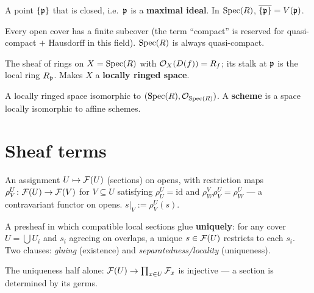 \begin{defbox}
A point $\{\mathfrak{p}\}$ that is closed, i.e.\ $\mathfrak{p}$ is a \textbf{maximal ideal}. In $\operatorname{Spec}(R)$,
$\overline{\{\mathfrak{p}\}}=V(\mathfrak{p})$.\hfill{}
\end{defbox}

\begin{defbox}
Every open cover has a finite subcover (the term ``compact'' is reserved for quasi-compact $+$
Hausdorff in this field). $\operatorname{Spec}(R)$ is always quasi-compact.\hfill{}
\end{defbox}

\begin{defbox}
The sheaf of rings on $X=\operatorname{Spec}(R)$ with $\mathcal{O}_X(D(f))=R_f$; its stalk at $\mathfrak{p}$ is the local ring
$R_{\mathfrak{p}}$. Makes $X$ a \textbf{locally ringed space}.\hfill{}
\end{defbox}

\begin{defbox}
A locally ringed space isomorphic to $(\operatorname{Spec}(R),\mathcal{O}_{\operatorname{Spec}(R)})$. A \textbf{scheme} is a space
locally isomorphic to affine schemes.\hfill{}
\end{defbox}

\section{Sheaf terms}

\begin{defbox}[Presheaf]
An assignment $U\mapsto\mathcal{F}(U)$ (sections) on opens, with restriction maps
$\rho^U_V\colon\mathcal{F}(U)\to\mathcal{F}(V)$ for $V\subseteq U$ satisfying $\rho^U_U=\mathrm{id}$ and
$\rho^V_W\rho^U_V=\rho^U_W$ --- a contravariant functor on opens. $s|_V:=\rho^U_V(s)$.\hfill{}
\end{defbox}

\begin{defbox}[Sheaf]
A presheaf in which compatible local sections glue \textbf{uniquely}: for any cover
$U=\bigcup U_i$ and $s_i$ agreeing on overlaps, a unique $s\in\mathcal{F}(U)$ restricts to each $s_i$.
Two clauses: \emph{gluing} (existence) and \emph{separatedness/locality} (uniqueness).\hfill{}
\end{defbox}

\begin{defbox}
The uniqueness half alone: $\mathcal{F}(U)\to\prod_{x\in U}\mathcal{F}_x$ is injective --- a section is
determined by its germs.\hfill{}
\end{defbox}

